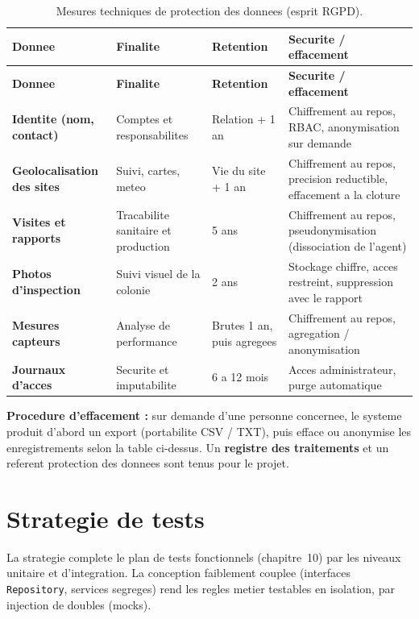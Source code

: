 {\small
\begin{xltabular}{\textwidth}{>{\bfseries}p{3.1cm} p{3.3cm} p{2.7cm} X}
\caption{Mesures techniques de protection des donnees (esprit RGPD).}
\label{tab:rgpd}\\
\toprule
\textbf{Donnee} & \textbf{Finalite} & \textbf{Retention} & \textbf{Securite / effacement} \\
\midrule
\endfirsthead
\toprule
\textbf{Donnee} & \textbf{Finalite} & \textbf{Retention} & \textbf{Securite / effacement} \\
\midrule
\endhead
Identite (nom, contact) & Comptes et responsabilites & Relation + 1 an & Chiffrement au repos, RBAC, anonymisation sur demande \\
Geolocalisation des sites & Suivi, cartes, meteo & Vie du site + 1 an & Chiffrement au repos, precision reductible, effacement a la cloture \\
Visites et rapports & Tracabilite sanitaire et production & 5 ans & Chiffrement au repos, pseudonymisation (dissociation de l'agent) \\
Photos d'inspection & Suivi visuel de la colonie & 2 ans & Stockage chiffre, acces restreint, suppression avec le rapport \\
Mesures capteurs & Analyse de performance & Brutes 1 an, puis agregees & Chiffrement au repos, agregation / anonymisation \\
Journaux d'acces & Securite et imputabilite & 6 a 12 mois & Acces administrateur, purge automatique \\
\bottomrule
\end{xltabular}}

\begin{encadre}
\textbf{Procedure d'effacement :} sur demande d'une personne concernee, le
systeme produit d'abord un export (portabilite CSV / TXT), puis efface ou
anonymise les enregistrements selon la table ci-dessus. Un \textbf{registre des
traitements} et un referent protection des donnees sont tenus pour le projet.
\end{encadre}

\section{Strategie de tests}
La strategie complete le plan de tests fonctionnels (chapitre~10) par les
niveaux unitaire et d'integration. La conception faiblement couplee (interfaces
\texttt{Repository}, services segreges) rend les regles metier testables en
isolation, par injection de doubles (mocks).

